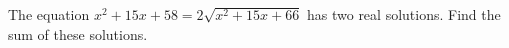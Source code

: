 The equation $x^{2}+15x+58=2\sqrt{x^{2}+15x+66}$ has two real solutions. Find the sum of these solutions.
